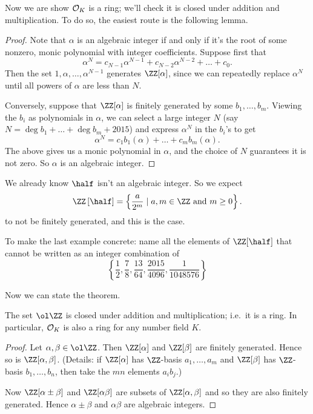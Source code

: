 Now we are show $\mathcal O_K$ is a ring;
we'll check it is closed under addition and multiplication.
To do so, the easiest route is the following lemma.

\newcommand{\tempaeuqnxhj}{$\ZZ[\alpha]$} %
\begin{proof}
	Note that $\alpha$ is an algebraic integer if and only if it's the root
	of some nonzero, monic polynomial with integer coefficients.
	Suppose first that
	\[ \alpha^N = c_{N-1} \alpha^{N-1} + c_{N-2} \alpha^{N-2} + \dots + c_0. \]
	Then the set $1, \alpha, \dots, \alpha^{N-1}$ generates $\ZZ[\alpha]$,
	since we can repeatedly replace $\alpha^N$ until all powers of $\alpha$
	are less than $N$.

	Conversely, suppose that $\ZZ[\alpha]$ is finitely generated
	by some $b_1, \dots, b_m$.
	Viewing the $b_i$ as polynomials in $\alpha$, we can select a large integer
	$N$ (say $N = \deg b_1 + \dots + \deg b_m + 2015$)
	and express $\alpha^N$ in the $b_i$'s to get
	\[ \alpha^N = c_1b_1(\alpha) + \dots + c_mb_m(\alpha). \]
	The above gives us a monic polynomial in $\alpha$,
	and the choice of $N$ guarantees it is not zero.
	So $\alpha$ is an algebraic integer.
\end{proof}
\begin{example}
	We already know $\half$ isn't an algebraic integer.
	So we expect 
	\[
		\ZZ \left[ \half \right]
		= \left\{ \frac{a}{2^m} \mid a, m \in \ZZ \text{ and } m \ge 0 \right\}.
	\]
	to not be finitely generated, and this is the case.
\end{example}
\begin{ques}
	To make the last example concrete:
	name all the elements of $\ZZ[\half]$
	that cannot be written as an integer combination of
	\[ \left\{ \frac12, \frac{7}{8}, \frac{13}{64},
		\frac{2015}{4096}, \frac{1}{1048576} \right\} \]
\end{ques}

Now we can state the theorem.
\begin{theorem}
	The set $\ol\ZZ$ is closed under addition and multiplication;
	i.e.\ it is a ring.
	In particular, $\mathcal O_K$ is also a ring for any number field $K$.
\end{theorem}
\begin{proof}
	Let $\alpha, \beta \in \ol\ZZ$.
	Then $\ZZ[\alpha]$ and $\ZZ[\beta]$ are finitely generated.
	Hence so is $\ZZ[\alpha, \beta]$.
	(Details: if $\ZZ[\alpha]$ has $\ZZ$-basis $a_1, \dots, a_m$ and
	$\ZZ[\beta]$ has $\ZZ$-basis $b_1, \dots, b_n$,
	then take the $mn$ elements $a_ib_j$.)

	Now $\ZZ[\alpha \pm \beta]$ and $\ZZ[\alpha \beta]$ are subsets of $\ZZ[\alpha,\beta]$ and so they are also finitely generated.
	Hence $\alpha \pm \beta$ and $\alpha\beta$ are algebraic integers.
\end{proof}


